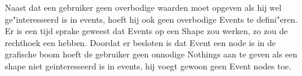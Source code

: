 Naast dat een gebruiker geen overbodige waarden moet opgeven als hij wel ge"interesseerd is in events, hoeft hij ook geen overbodige Events te defini"eren. Er is een tijd sprake geweest dat Events op een Shape zou werken, zo zou de rechthoek een  hebben. Doordat er besloten is dat Event een node is in de grafische boom hoeft de gebruiker geen onnodige Nothings aan te geven als een shape niet geinteresseerd is in events, hij voegt gewoon geen Event nodes toe.

